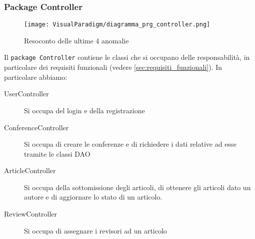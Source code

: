 \subsubsection{Package Controller}
\label{sec:package_controller}
\begin{figure}[ht]
  \centering
  \texttt{[image: VisualParadigm/diagramma\_prg\_controller.png]}
  \caption{Resoconto delle ultime 4 anomalie}
  \label{fig:anomalie}
\end{figure}

Il \texttt{package Controller} contiene le classi che si occupano delle
responsabilità, in particolare dei requisiti funzionali (vedere \ref{sec:requisiti_funzionali}).
In particolare abbiamo:
\begin{description}
\item[UserController] Si occupa del login e della registrazione
\item[ConferenceController] Si occupa di creare le conferenze e di richiedere
  i dati relative ad esse tramite le classi DAO
\item[ArticleController] Si occupa della sottomissione degli articoli, di ottenere gli articoli dato un autore e di aggiornare lo stato di un articolo.
\item[ReviewController] Si occupa di assegnare i revisori ad un articolo
\end{description}

